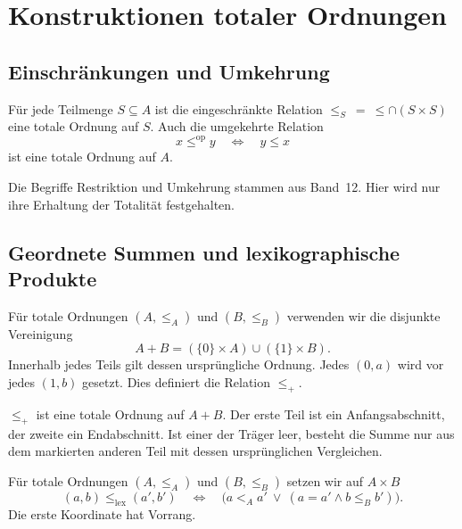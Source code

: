 \chapter{Konstruktionen totaler Ordnungen}
\label{b15guide:ch:constructions}

\section{Einschränkungen und Umkehrung}

\begin{theorem}
\label{b15guide:thm:restriction-dual}
Für jede Teilmenge $S\subseteq A$ ist die eingeschränkte
Relation $\leq_S\ =\ \leq\cap(S\times S)$ eine totale
Ordnung auf $S$.
Auch die umgekehrte Relation
\[
 x\leq^{\mathrm{op}}y\quad\Longleftrightarrow\quad y\leq x
\]
ist eine totale Ordnung auf $A$.
\end{theorem}

Die Begriffe Restriktion und Umkehrung stammen aus Band~12.
Hier wird nur ihre Erhaltung der Totalität festgehalten.

\section{Geordnete Summen und lexikographische Produkte}

\begin{definition}
\label{b15guide:def:sum}
Für totale Ordnungen $(A,\leq_A)$ und $(B,\leq_B)$
verwenden wir die disjunkte Vereinigung
\[
 A+B=(\{0\}\times A)\cup(\{1\}\times B).
\]
Innerhalb jedes Teils gilt dessen ursprüngliche Ordnung.
Jedes $(0,a)$ wird vor jedes $(1,b)$ gesetzt.
Dies definiert die Relation $\leq_+$.
\end{definition}

\begin{theorem}
\label{b15guide:thm:sum}
$\leq_+$ ist eine totale Ordnung auf $A+B$.
Der erste Teil ist ein Anfangsabschnitt, der zweite ein
Endabschnitt. Ist einer der Träger leer, besteht die Summe nur aus
dem markierten anderen Teil mit dessen ursprünglichen Vergleichen.
\end{theorem}

\begin{definition}
\label{b15guide:def:lex}
Für totale Ordnungen $(A,\leq_A)$ und $(B,\leq_B)$
setzen wir auf $A\times B$
\[
 (a,b)\leq_{\mathrm{lex}}(a',b')
 \quad\Longleftrightarrow\quad
 \bigl(a<_A a'\ \lor\ (a=a'\land b\leq_B b')\bigr).
\]
Die erste Koordinate hat Vorrang.
\end{definition}

